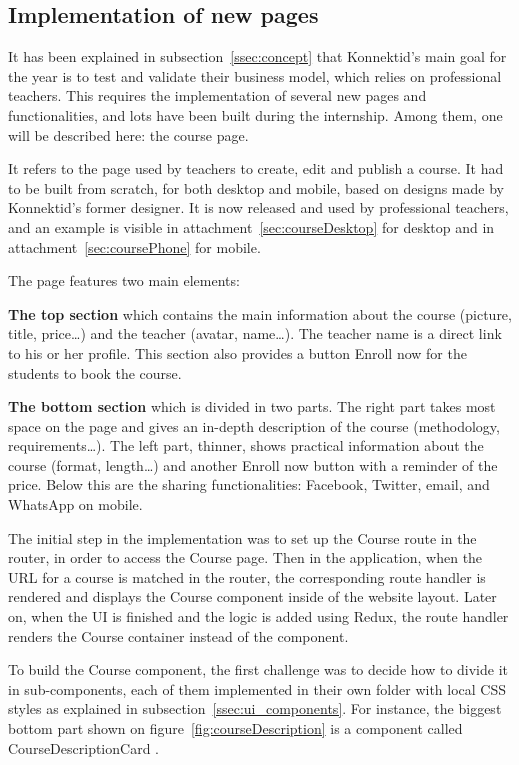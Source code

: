 \subsection{Implementation of new pages}
\label{ssec:new_pages}

It has been explained in {\sc subsection}~\ref{ssec:concept} that Konnektid's main goal for the year is to test and validate their business model, which relies on
professional teachers. This requires the implementation of several new pages and functionalities, and lots have been built during the internship. Among them, one will be described here: the course page.

It refers to the page used by teachers to create, edit and publish a course. It had to be built from scratch, for both desktop and mobile, based on designs
made by Konnektid's former designer. It is now released and used by professional teachers, and an example is visible in {\sc attachment}~\ref{sec:courseDesktop} for desktop and in {\sc attachment}~\ref{sec:coursePhone} for mobile.

The page features two main elements:

\textbf{The top section} which contains the main information about the course (picture, title, price\ldots) and the teacher (avatar, name\ldots).
The teacher name is a direct link to his or her profile. This section also provides a button \guillemotleft{} Enroll now \guillemotright{} for the students to book the course.

\textbf{The bottom section} which is divided in two parts. The right part takes most space on the page and gives an in-depth description of the course
(methodology, requirements\ldots). The left part, thinner, shows practical information about the course (format, length\ldots) and another \guillemotleft{} Enroll now \guillemotright{} button with a reminder of the price. Below this are the sharing functionalities: Facebook, Twitter,
email, and WhatsApp on mobile.

The initial step in the implementation was to set up the \guillemotleft{} Course \guillemotright{} route in the router, in order to access the Course page. Then in the application, when the URL for a course is matched in the router, the corresponding route handler is rendered and displays the Course component inside of the website layout. Later on, when the UI is finished and the logic is added using Redux, the route handler renders the Course container instead of the component.

To build the Course component, the first challenge was to decide how to divide it in sub-components, each of them implemented in their own folder with local CSS styles as explained in {\sc subsection}~\ref{ssec:ui_components}. For instance, the biggest bottom part shown on {\sc figure}~\ref{fig:courseDescription} is a component called \guillemotleft{} CourseDescriptionCard \guillemotright{}.

